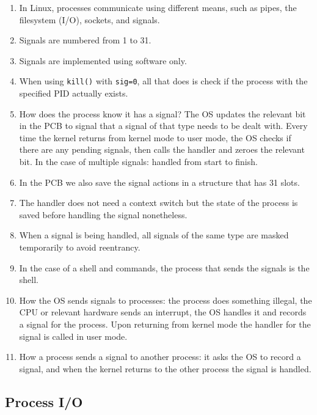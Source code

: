 \documentclass[12pt,a4paper]{article}
\newcommand{\tocsubsection}[1]{%
  \subsection*{#1}%
  \phantomsection
  \addcontentsline{toc}{subsection}{#1}%
}
\begin{document}
\begin{enumerate}
  \item In Linux, processes communicate using different means, such as pipes, the filesystem (I/O), sockets, and signals.
  \item Signals are numbered from 1 to 31.
  \item Signals are implemented using software only.
  \item When using \texttt{kill()} with \texttt{sig=0}, all that does is check if the process with the specified PID actually exists.
  \item How does the process know it has a signal? The OS updates the relevant bit in the PCB to signal that a signal of that type needs to be dealt with. Every time the kernel returns from kernel mode to user mode, the OS checks if there are any pending signals, then calls the handler and zeroes the relevant bit. In the case of multiple signals: handled from start to finish.
  \item In the PCB we also save the signal actions in a structure that has 31 slots.
  \item The handler does not need a context switch but the state of the process is saved before handling the signal nonetheless.
  \item When a signal is being handled, all signals of the same type are masked temporarily to avoid reentrancy.
  \item In the case of a shell and commands, the process that sends the signals is the shell.
  \item How the OS sends signals to processes: the process does something illegal, the CPU or relevant hardware sends an interrupt, the OS handles it and records a signal for the process. Upon returning from kernel mode the handler for the signal is called in user mode.
  \item How a process sends a signal to another process: it asks the OS to record a signal, and when the kernel returns to the other process the signal is handled.
\end{enumerate}

\tocsubsection{Process I/O}
\end{document}
